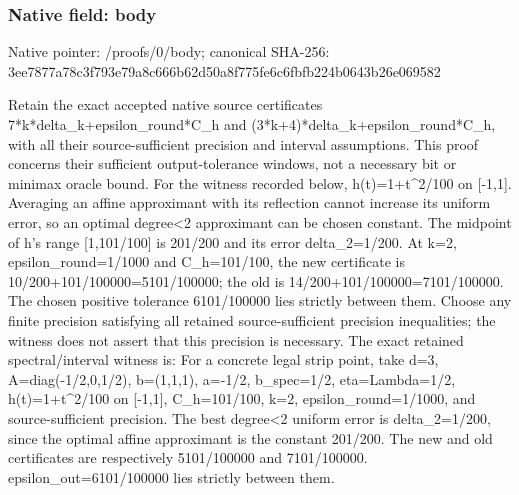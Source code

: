 \documentclass[10pt,a4paper]{article}
\begin{document}
\subsubsection{Native field: body}
Native pointer: /proofs/0/body; canonical SHA-256: 3ee7877a78c3f793e79a8c666b62d50a8f775fe6c6fbfb224b0643b26e069582

\begingroup\raggedright\sloppy Retain the exact accepted native source certificates 7*k*delta\_\allowbreak{}k+epsilon\_\allowbreak{}round*C\_\allowbreak{}h and (3*k+4)*delta\_\allowbreak{}k+epsilon\_\allowbreak{}round*C\_\allowbreak{}h,\allowbreak{} with all their source-sufficient precision and interval assumptions. This proof concerns their sufficient output-tolerance windows,\allowbreak{} not a necessary bit or minimax oracle bound. For the witness recorded below,\allowbreak{} h(t)=\allowbreak{}1+t\textasciicircum{}2/\allowbreak{}100 on [-1,\allowbreak{}1]. Averaging an affine approximant with its reflection cannot increase its uniform error,\allowbreak{} so an optimal degree<2 approximant can be chosen constant. The midpoint of h's range [1,\allowbreak{}101/\allowbreak{}100] is 201/\allowbreak{}200 and its error delta\_\allowbreak{}2=\allowbreak{}1/\allowbreak{}200. At k=\allowbreak{}2,\allowbreak{} epsilon\_\allowbreak{}round=\allowbreak{}1/\allowbreak{}1000 and C\_\allowbreak{}h=\allowbreak{}101/\allowbreak{}100,\allowbreak{} the new certificate is 10/\allowbreak{}200+101/\allowbreak{}100000=\allowbreak{}5101/\allowbreak{}100000;\allowbreak{} the old is 14/\allowbreak{}200+101/\allowbreak{}100000=\allowbreak{}7101/\allowbreak{}100000. The chosen positive tolerance 6101/\allowbreak{}100000 lies strictly between them. Choose any finite precision satisfying all retained source-sufficient precision inequalities;\allowbreak{} the witness does not assert that this precision is necessary. The exact retained spectral/\allowbreak{}interval witness is:\allowbreak{} For a concrete legal strip point,\allowbreak{} take d=\allowbreak{}3,\allowbreak{} A=\allowbreak{}diag(-1/\allowbreak{}2,\allowbreak{}0,\allowbreak{}1/\allowbreak{}2),\allowbreak{} b=\allowbreak{}(1,\allowbreak{}1,\allowbreak{}1),\allowbreak{} a=\allowbreak{}-1/\allowbreak{}2,\allowbreak{} b\_\allowbreak{}spec=\allowbreak{}1/\allowbreak{}2,\allowbreak{} eta=\allowbreak{}Lambda=\allowbreak{}1/\allowbreak{}2,\allowbreak{} h(t)=\allowbreak{}1+t\textasciicircum{}2/\allowbreak{}100 on [-1,\allowbreak{}1],\allowbreak{} C\_\allowbreak{}h=\allowbreak{}101/\allowbreak{}100,\allowbreak{} k=\allowbreak{}2,\allowbreak{} epsilon\_\allowbreak{}round=\allowbreak{}1/\allowbreak{}1000,\allowbreak{} and source-sufficient precision. The best degree<2 uniform error is delta\_\allowbreak{}2=\allowbreak{}1/\allowbreak{}200,\allowbreak{} since the optimal affine approximant is the constant 201/\allowbreak{}200. The new and old certificates are respectively 5101/\allowbreak{}100000 and 7101/\allowbreak{}100000. epsilon\_\allowbreak{}out=\allowbreak{}6101/\allowbreak{}100000 lies strictly between them.\par\endgroup
\end{document}

